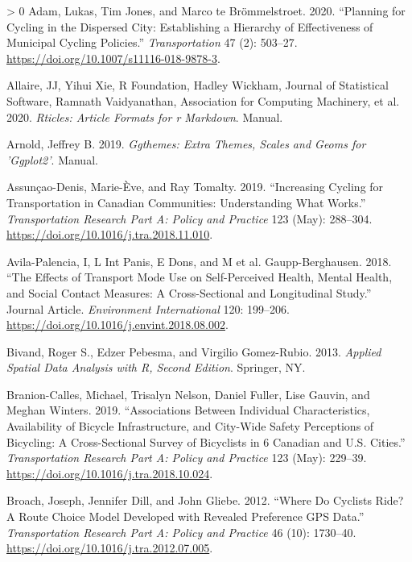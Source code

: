 \documentclass[smallextended]{svjour3}       %
\newlength{\cslhangindent}
\newenvironment{CSLReferences}[3] %
 {%
  \setlength{\parindent}{0pt}
  \ifodd #1 \everypar{\setlength{\hangindent}{\cslhangindent}}\ignorespaces\fi
  \ifnum #2 > 0
  \setlength{\parskip}{#2\baselineskip}
  \fi
 }%
 {}
\begin{document}
\hypertarget{refs}{}
\begin{CSLReferences}{1}{0}
\leavevmode\hypertarget{ref-Adam2020}{}%
Adam, Lukas, Tim Jones, and Marco te Brömmelstroet. 2020. {``Planning
for Cycling in the Dispersed City: Establishing a Hierarchy of
Effectiveness of Municipal Cycling Policies.''} \emph{Transportation} 47
(2): 503--27. \url{https://doi.org/10.1007/s11116-018-9878-3}.

\leavevmode\hypertarget{ref-Allaire2020}{}%
Allaire, JJ, Yihui Xie, R Foundation, Hadley Wickham, Journal of
Statistical Software, Ramnath Vaidyanathan, Association for Computing
Machinery, et al. 2020. \emph{Rticles: {Article} Formats for r
Markdown}. Manual.

\leavevmode\hypertarget{ref-Arnold2019}{}%
Arnold, Jeffrey B. 2019. \emph{Ggthemes: {Extra} Themes, Scales and
Geoms for 'Ggplot2'}. Manual.

\leavevmode\hypertarget{ref-Assuncao2019}{}%
Assunçao-Denis, Marie-Ève, and Ray Tomalty. 2019. {``Increasing Cycling
for Transportation in {Canadian} Communities: {Understanding} What
Works.''} \emph{Transportation Research Part A: Policy and Practice} 123
(May): 288--304. \url{https://doi.org/10.1016/j.tra.2018.11.010}.

\leavevmode\hypertarget{ref-Avila2018}{}%
Avila-Palencia, I, L Int Panis, E Dons, and M et al. Gaupp-Berghausen.
2018. {``The Effects of Transport Mode Use on Self-Perceived Health,
Mental Health, and Social Contact Measures: {A} Cross-Sectional and
Longitudinal Study.''} Journal Article. \emph{Environment International}
120: 199--206. \url{https://doi.org/10.1016/j.envint.2018.08.002}.

\leavevmode\hypertarget{ref-Bivand2013}{}%
Bivand, Roger S., Edzer Pebesma, and Virgilio Gomez-Rubio. 2013.
\emph{Applied Spatial Data Analysis with {R}, {Second} Edition}.
{Springer, NY}.

\leavevmode\hypertarget{ref-Branion2019}{}%
Branion-Calles, Michael, Trisalyn Nelson, Daniel Fuller, Lise Gauvin,
and Meghan Winters. 2019. {``Associations Between Individual
Characteristics, Availability of Bicycle Infrastructure, and City-Wide
Safety Perceptions of Bicycling: {A} Cross-Sectional Survey of
Bicyclists in 6 {Canadian} and {U}.{S}. Cities.''} \emph{Transportation
Research Part A: Policy and Practice} 123 (May): 229--39.
\url{https://doi.org/10.1016/j.tra.2018.10.024}.

\leavevmode\hypertarget{ref-Broach2012}{}%
Broach, Joseph, Jennifer Dill, and John Gliebe. 2012. {``Where Do
Cyclists Ride? {A} Route Choice Model Developed with Revealed Preference
{GPS} Data.''} \emph{Transportation Research Part A: Policy and
Practice} 46 (10): 1730--40.
\url{https://doi.org/10.1016/j.tra.2012.07.005}.


\end{CSLReferences}
\end{document}
